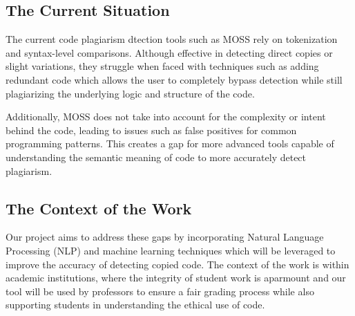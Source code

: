 \documentclass[12pt]{article}
\begin{document}
\subsection{The Current Situation}
The current code plagiarism dtection tools such as MOSS rely on tokenization and syntax-level comparisons. Although effective
in detecting direct copies or slight variations, they struggle when faced with techniques such as adding redundant code which
allows the user to completely bypass detection while still plagiarizing the underlying logic and structure of the code.

Additionally, MOSS does not take into account for the complexity or intent behind the code, leading to issues such as false
positives for common programming patterns. This creates a gap for more advanced tools capable of understanding the semantic 
meaning of code to more accurately detect plagiarism.
\subsection{The Context of the Work}
Our project aims to address these gaps by incorporating Natural Language Processing (NLP) and machine learning techniques
which will be leveraged to improve the accuracy of detecting copied code. The context of the work is within academic institutions,
where the integrity of student work is aparmount and our tool will be used by professors to ensure a fair grading process
while also supporting students in understanding the ethical use of code.
\end{document}
